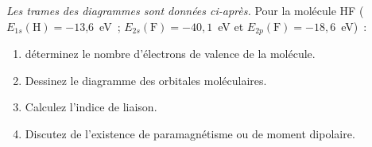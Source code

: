 \textit{Les trames des diagrammes sont donn\'ees ci-apr\`es.}
Pour la mol\'ecule HF 
($E_{1s}(\textrm{H})=-13\textrm{,}6$~eV~; $E_{2s}(\textrm{F})=-40,1$~eV et $E_{2p}(\textrm{F})=-18,6$~eV)~:
\begin{enumerate}[\bf 1)]
\item d\'eterminez le nombre d'\'electrons de valence de la mol\'ecule.
\item Dessinez le diagramme des orbitales mol\'eculaires.
\item Calculez l'indice de liaison.
\item Discutez de l'existence de paramagn\'etisme ou de moment dipolaire.
\end{enumerate}


